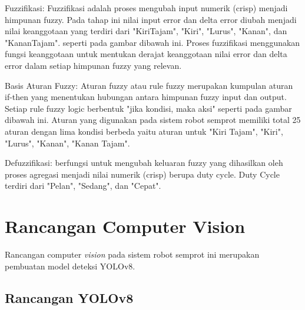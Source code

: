 \begin{packed_enum}
	\item Fuzzifikasi: Fuzzifikasi adalah proses mengubah input numerik (crisp) menjadi himpunan fuzzy. Pada tahap ini nilai input error dan delta error diubah menjadi nilai keanggotaan yang terdiri dari "KiriTajam", "Kiri", "Lurus", "Kanan", dan "KananTajam".  seperti pada gambar dibawah ini. Proses fuzzifikasi menggunakan fungsi keanggotaan untuk mentukan derajat keanggotaan nilai error dan delta error dalam setiap himpunan fuzzy yang relevan.
	
	\item Basis Aturan Fuzzy: Aturan fuzzy atau rule fuzzy merupakan kumpulan aturan if-then yang menentukan hubungan antara himpunan fuzzy input dan output.  Setiap rule fuzzy logic berbentuk "jika kondisi, maka aksi" seperti pada gambar dibawah ini. Aturan yang digunakan pada sistem robot semprot memiliki total 25 aturan dengan lima kondisi berbeda yaitu aturan untuk "Kiri Tajam", "Kiri", "Lurus", "Kanan", "Kanan Tajam".
	\item Defuzzifikasi: berfungsi untuk mengubah keluaran fuzzy yang dihasilkan oleh proses agregasi menjadi nilai numerik (crisp) berupa duty cycle. Duty Cycle terdiri dari "Pelan", "Sedang", dan "Cepat".
\end{packed_enum}	

\section{Rancangan Computer Vision}
Rancangan computer\textit{ vision} pada sistem robot semprot ini merupakan pembuatan model deteksi YOLOv8.
\subsection{Rancangan YOLOv8}

